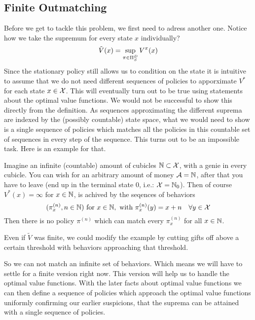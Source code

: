 \subsection{Finite Outmatching}
Before we get to tackle this problem, we first need to adress another one. Notice how we take the supremum for every state \(x\) individually? 
\begin{equation*}
\tilde{V}(x)=\sup_{\pi\in\Pi_S^D}V^\pi(x) 
\end{equation*}
Since the stationary policy still allows us to condition on the state it is intuitive to assume that we do not need different sequences of policies to apporximate \(V^*\) for each state \(x\in\mathcal{X}\). This will eventually turn out to be true using statements about the optimal value functions. We would not be successful to show this directly from the definition. As sequences approximating the different suprema are indexed by the (possibly countable) state space, what we would need to show is a single sequence of policies which matches all the policies in this countable set of sequences in every step of the sequence. This turns out to be an impossible task. Here is an example for that. 

\begin{example} \label{genie cubicles}
Imagine an infinite (countable) amount of cubicles \(\mathbb{N} \subset \mathcal{X}\), with a genie in every cubicle. You can wish for an arbitrary amount of money \(\mathcal{A}=\mathbb{N}\), after that you have to leave (end up in the terminal state \(0\), i.e.: \(\mathcal{X}=\mathbb{N}_0\)). Then of course \(V^*(x)=\infty\) for \(x\in\mathbb{N}\), is achived by the seqences of behaviors 
\[
	(\pi_x^{(n)}, n\in\mathbb{N})\text{ for } x\in\mathbb{N}, \text{ with } \pi_x^{(n)}(y)=x+n\quad \forall y\in\mathcal{X}
\]
Then there is no policy \(\pi^{(n)}\) which can match every \(\pi_x^{(n)}\) for all \(x\in\mathbb{N}\).

Even if \(\tilde{V}\) was finite, we could modify the example by cutting gifts off above a certain threshold with behaviors approaching that threshold. 
\end{example}

So we can not match an infinite set of behaviors. Which means we will have to settle for a finite version right now. This version will help us to handle the optimal value functions. With the later facts about optimal value functions we can then define a sequence of policies which approach the optimal value functions uniformly confirming our earlier suspicions, that the suprema can be attained with a single sequence of policies. 

